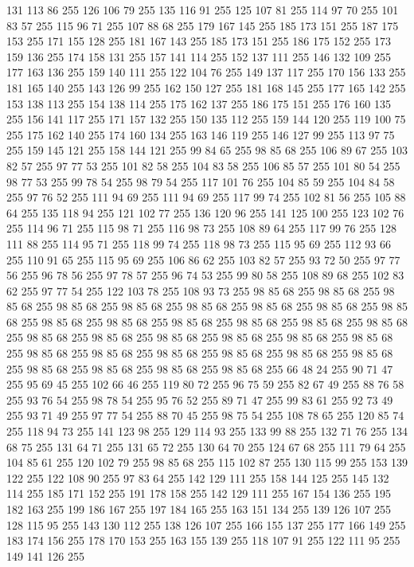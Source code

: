 131 113 86 255 126 106 79 255 135 116 91 255 125 107 81 255 114 97 70 255 101 83 57 255 115 96 71 255 107 88 68 255 179 167 145 255 185 173 151 255 187 175 153 255 171 155 128 255 181 167 143 255 185 173 151 255 186 175 152 255 173 159 136 255 174 158 131 255 157 141 114 255 152 137 111 255 146 132 109 255 177 163 136 255 159 140 111 255 122 104 76 255 149 137 117 255 170 156 133 255 181 165 140 255 143 126 99 255 162 150 127 255 181 168 145 255 177 165 142 255 153 138 113 255 154 138 114 255 175 162 137 255 186 175 151 255 176 160 135 255 156 141 117 255 171 157 132 255 150 135 112 255 159 144 120 255 119 100 75 255 175 162 140 255 174 160 134 255 163 146 119 255 146 127 99 255 113 97 75 255 159 145 121 255 158 144 121 255 99 84 65 255 98 85 68 255 106 89 67 255 103 82 57 255 97 77 53 255 101 82 58 255 104 83 58 255 106 85 57 255 101 80 54 255 98 77 53 255 99 78 54 255 98 79 54 255 117 101 76 255 104 85 59 255 104 84 58 255 97 76 52 255 111 94 69 255
111 94 69 255 117 99 74 255 102 81 56 255 105 88 64 255 135 118 94 255 121 102 77 255 136 120 96 255 141 125 100 255 123 102 76 255 114 96 71 255 115 98 71 255 116 98 73 255 108 89 64 255 117 99 76 255 128 111 88 255 114 95 71 255 118 99 74 255 118 98 73 255 115 95 69 255 112 93 66 255 110 91 65 255 115 95 69 255 106 86 62 255 103 82 57 255 93 72 50 255 97 77 56 255 96 78 56 255 97 78 57 255 96 74 53 255 99 80 58 255 108 89 68 255 102 83 62 255 97 77 54 255 122 103 78 255 108 93 73 255 98 85 68 255 98 85 68 255 98 85 68 255 98 85 68 255 98 85 68 255 98 85 68 255 98 85 68 255 98 85 68 255 98 85 68 255 98 85 68 255 98 85 68 255 98 85 68 255 98 85 68 255 98 85 68 255 98 85 68 255 98 85 68 255 98 85 68 255 98 85 68 255 98 85 68 255 98 85 68 255 98 85 68 255 98 85 68 255 98 85 68 255 98 85 68 255 98 85 68 255 98 85 68 255 98 85 68 255 98 85 68 255 98 85 68 255
98 85 68 255 98 85 68 255 66 48 24 255 90 71 47 255 95 69 45 255 102 66 46 255 119 80 72 255 96 75 59 255 82 67 49 255 88 76 58 255 93 76 54 255 98 78 54 255 95 76 52 255 89 71 47 255 99 83 61 255 92 73 49 255 93 71 49 255 97 77 54 255 88 70 45 255 98 75 54 255 108 78 65 255 120 85 74 255 118 94 73 255 141 123 98 255 129 114 93 255 133 99 88 255 132 71 76 255 134 68 75 255 131 64 71 255 131 65 72 255 130 64 70 255 124 67 68 255 111 79 64 255 104 85 61 255 120 102 79 255 98 85 68 255 115 102 87 255 130 115 99 255 153 139 122 255 122 108 90 255 97 83 64 255 142 129 111 255 158 144 125 255 145 132 114 255 185 171 152 255 191 178 158 255 142 129 111 255 167 154 136 255 195 182 163 255 199 186 167 255 197 184 165 255 163 151 134 255 139 126 107 255 128 115 95 255 143 130 112 255 138 126 107 255 166 155 137 255 177 166 149 255 183 174 156 255 178 170 153 255 163 155 139 255 118 107 91 255 122 111 95 255 149 141 126 255
